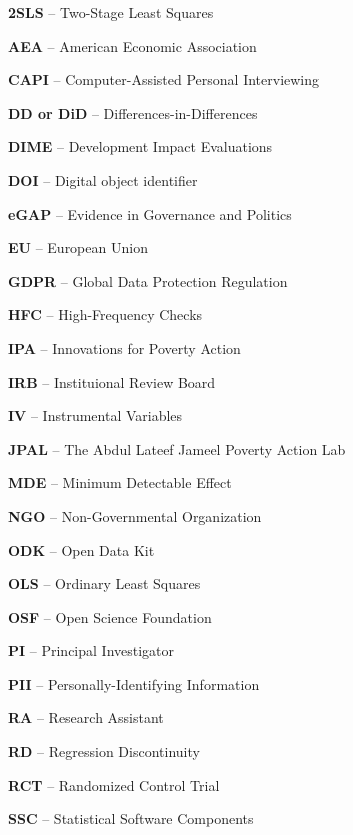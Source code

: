 \noindent\textbf{2SLS} -- Two-Stage Least Squares

\noindent\textbf{AEA} -- American Economic Association

\noindent\textbf{CAPI} -- Computer-Assisted Personal Interviewing

\noindent\textbf{DD or DiD} -- Differences-in-Differences

\noindent\textbf{DIME} -- Development Impact Evaluations

\noindent\textbf{DOI} -- Digital object identifier

\noindent\textbf{eGAP} -- Evidence in Governance and Politics

\noindent\textbf{EU} -- European Union

\noindent\textbf{GDPR} -- Global Data Protection Regulation

\noindent\textbf{HFC} -- High-Frequency Checks

\noindent\textbf{IPA} -- Innovations for Poverty Action

\noindent\textbf{IRB} -- Instituional Review Board

\noindent\textbf{IV} -- Instrumental Variables

\noindent\textbf{JPAL} -- The Abdul Lateef Jameel Poverty Action Lab

\noindent\textbf{MDE} -- Minimum Detectable Effect

\noindent\textbf{NGO} -- Non-Governmental Organization

\noindent\textbf{ODK} -- Open Data Kit

\noindent\textbf{OLS} -- Ordinary Least Squares

\noindent\textbf{OSF} -- Open Science Foundation

\noindent\textbf{PI} -- Principal Investigator

\noindent\textbf{PII} -- Personally-Identifying Information

\noindent\textbf{RA} -- Research Assistant

\noindent\textbf{RD} -- Regression Discontinuity

\noindent\textbf{RCT} -- Randomized Control Trial

\noindent\textbf{SSC} -- Statistical Software Components
